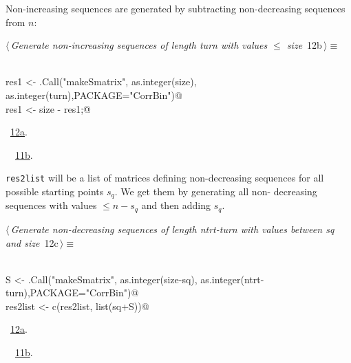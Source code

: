 \documentclass[reqno]{amsart}
\renewcommand{\NWtarget}[2]{\hypertarget{#1}{#2}}
\renewcommand{\NWlink}[2]{\hyperlink{#1}{#2}}
\begin{document}
Non-increasing sequences are generated by subtracting non-decreasing sequences
from  $n$:
\begin{flushleft} \small
\begin{minipage}{\linewidth}\label{scrap17}\raggedright\small
\NWtarget{nuweb12b}{} $\langle\,${\itshape Generate non-increasing sequences of length turn with values $\leq$ size}\nobreak\ {\footnotesize {12b}}$\,\rangle\equiv$
\vspace{-1ex}
\begin{list}{}{} \item
\mbox{}\verb@@\\
\mbox{}\verb@  res1 <- .Call("makeSmatrix", as.integer(size), as.integer(turn),PACKAGE="CorrBin")@\\
\mbox{}\verb@  res1 <- size - res1;@\\
\mbox{}\verb@@{\NWsep}
\end{list}
\vspace{-1.5ex}
\footnotesize
\begin{list}{}{\setlength{\itemsep}{-\parsep}\setlength{\itemindent}{-\leftmargin}}
\item \NWtxtMacroRefIn\ \NWlink{nuweb12a}{12a}.
\item \NWtxtIdentsUsed\nobreak\  \verb@makeSmatrix@\nobreak\ \NWlink{nuweb11b}{11b}.
\item{}
\end{list}
\end{minipage}\vspace{4ex}
\end{flushleft}
\texttt{res2list} will be a list of matrices defining non-decreasing sequences
for all possible starting points $s_q$. We get them by generating all non-
decreasing sequences with values $\leq n-s_q$ and then adding $s_q$. 
\begin{flushleft} \small
\begin{minipage}{\linewidth}\label{scrap18}\raggedright\small
\NWtarget{nuweb12c}{} $\langle\,${\itshape Generate non-decreasing sequences of length ntrt-turn with values between sq and size}\nobreak\ {\footnotesize {12c}}$\,\rangle\equiv$
\vspace{-1ex}
\begin{list}{}{} \item
\mbox{}\verb@@\\
\mbox{}\verb@  S <- .Call("makeSmatrix", as.integer(size-sq), as.integer(ntrt-turn),PACKAGE="CorrBin")@\\
\mbox{}\verb@  res2list <- c(res2list, list(sq+S))@\\
\mbox{}\verb@@{\NWsep}
\end{list}
\vspace{-1.5ex}
\footnotesize
\begin{list}{}{\setlength{\itemsep}{-\parsep}\setlength{\itemindent}{-\leftmargin}}
\item \NWtxtMacroRefIn\ \NWlink{nuweb12a}{12a}.
\item \NWtxtIdentsUsed\nobreak\  \verb@makeSmatrix@\nobreak\ \NWlink{nuweb11b}{11b}.
\item{}
\end{list}
\end{minipage}\vspace{4ex}
\end{flushleft}
\end{document}
